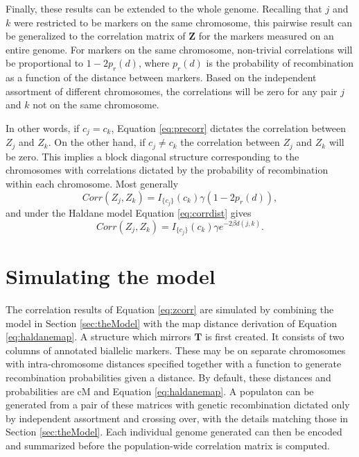 \documentclass{article}
\newcommand{\ve}[1]{\mathbf{#1}}           %
\newcommand{\m}[1]{\mathbf{#1}}               %
\newcommand{\ind}[2]{I_{#2} \left( #1 \right)}
\begin{document}
Finally, these results can be extended to the whole genome. Recalling that $j$ and $k$ were restricted to be markers on the same chromosome, this pairwise result can be generalized to the correlation matrix of $\ve{Z}$ for the markers measured on an entire genome. For markers on the same chromosome, non-trivial correlations will be proportional to $1 - 2p_r(d)$, where $p_r(d)$ is the probability of recombination as a function of the distance between markers. Based on the independent assortment of different chromosomes, the correlations will be zero for any pair $j$ and $k$ not on the same chromosome.

In other words, if $c_j = c_k$, Equation \ref{eq:precorr} dictates the correlation between $Z_j$ and $Z_k$. On the other hand, if $c_j \neq c_k$ the correlation between $Z_j$ and $Z_k$ will be zero. This implies a block diagonal structure corresponding to the chromosomes with correlations dictated by the probability of recombination within each chromosome. Most generally
\begin{equation} \label{eq:zcorr_gen}
  Corr(Z_j, Z_k) = \ind{c_k}{\{c_j\}} \gamma (1 - 2p_r(d)),
\end{equation}
and under the Haldane model Equation \ref{eq:corrdist} gives
\begin{equation} \label{eq:zcorr}
  Corr(Z_j, Z_k) = \ind{c_k}{\{c_j\}} \gamma e^{-2 \beta d(j,k)}.
\end{equation}


\section{Simulating the model} \label{sec:sim}

The correlation results of Equation \ref{eq:zcorr} are simulated by combining the model in Section \ref{sec:theModel} with the map distance derivation of Equation \ref{eq:haldanemap}. A structure which mirrors $\m{T}$ is first created. It consists of two columns of annotated biallelic markers. These may be on separate chromosomes with intra-chromosome distances specified together with a function to generate recombination probabilities given a distance. By default, these distances and probabilities are cM and Equation \ref{eq:haldanemap}. A populaton can be generated from a pair of these matrices with genetic recombination dictated only by independent assortment and crossing over, with the details matching those in Section \ref{sec:theModel}. Each individual genome generated can then be encoded and summarized before the population-wide correlation matrix is computed.
\end{document}
